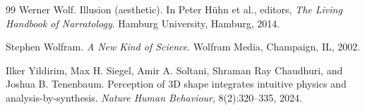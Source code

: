\documentclass[11pt,a4paper]{article}
\theoremstyle{remark}\newtheorem{remark}[definition]{Remark}
\begin{document}
\begin{thebibliography}{99}
Werner Wolf.
\newblock Illusion (aesthetic).
\newblock In Peter H\"uhn et al., editors, \emph{The Living Handbook of Narratology}. Hamburg University, Hamburg, 2014.

Stephen Wolfram.
\newblock \emph{A New Kind of Science}.
\newblock Wolfram Media, Champaign, IL, 2002.

Ilker Yildirim, Max H. Siegel, Amir A. Soltani, Shraman Ray Chaudhuri, and Joshua B. Tenenbaum.
\newblock Perception of 3D shape integrates intuitive physics and analysis-by-synthesis.
\newblock \emph{Nature Human Behaviour}, 8(2):320--335, 2024.
\end{thebibliography}
\end{document}
